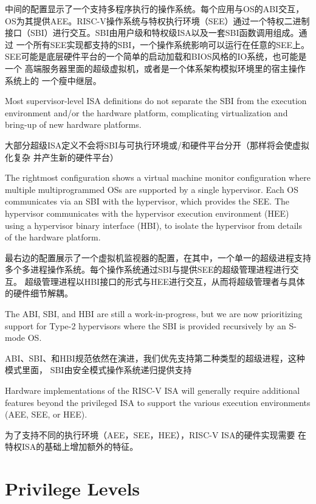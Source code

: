 中间的配置显示了一个支持多程序执行的操作系统。每个应用与OS的ABI交互，
OS为其提供AEE。RISC-V操作系统与特权执行环境（SEE）通过一个特权二进制
接口（SBI）进行交互。SBI由用户级和特权级ISA以及一套SBI函数调用组成。通过
一个所有SEE实现都支持的SBI，一个操作系统影响可以运行在任意的SEE上。
SEE可能是底层硬件平台的一个简单的启动加载和BIOS风格的IO系统，也可能是一个
高端服务器里面的超级虚拟机，或者是一个体系架构模拟环境里的宿主操作系统上的
一个瘦中继层。
\begin{commentary}
Most supervisor-level ISA definitions do not separate the SBI from the
execution environment and/or the hardware platform, complicating
virtualization and bring-up of new hardware platforms.

大部分超级ISA定义不会将SBI与可执行环境或/和硬件平台分开（那样将会使虚拟化复杂
并产生新的硬件平台）
\end{commentary}

The rightmost configuration shows a virtual machine monitor
configuration where multiple multiprogrammed OSs are supported by a
single hypervisor.  Each OS communicates via an SBI with the
hypervisor, which provides the SEE.  The hypervisor communicates with
the hypervisor execution environment (HEE) using a hypervisor binary
interface (HBI), to isolate the hypervisor from details of the
hardware platform.

最右边的配置展示了一个虚拟机监视器的配置，在其中，一个单一的超级进程支持
多个多进程操作系统。每个操作系统通过SBI与提供SEE的超级管理进程进行交互。
超级管理进程以HBI接口的形式与HEE进行交互，从而将超级管理者与具体的硬件细节解耦。

\begin{commentary}
The ABI, SBI, and HBI are still a work-in-progress, but we are now
prioritizing support for Type-2 hypervisors where the SBI is provided
recursively by an S-mode OS.

ABI、SBI、和HBI规范依然在演进，我们优先支持第二种类型的超级进程，这种模式里面，
SBI由安全模式操作系统递归提供支持
\end{commentary}

Hardware implementations of the RISC-V ISA will generally require
additional features beyond the privileged ISA to support the various
execution environments (AEE, SEE, or HEE).

为了支持不同的执行环境（AEE，SEE，HEE），RISC-V ISA的硬件实现需要
在特权ISA的基础上增加额外的特征。

\section{Privilege Levels}

